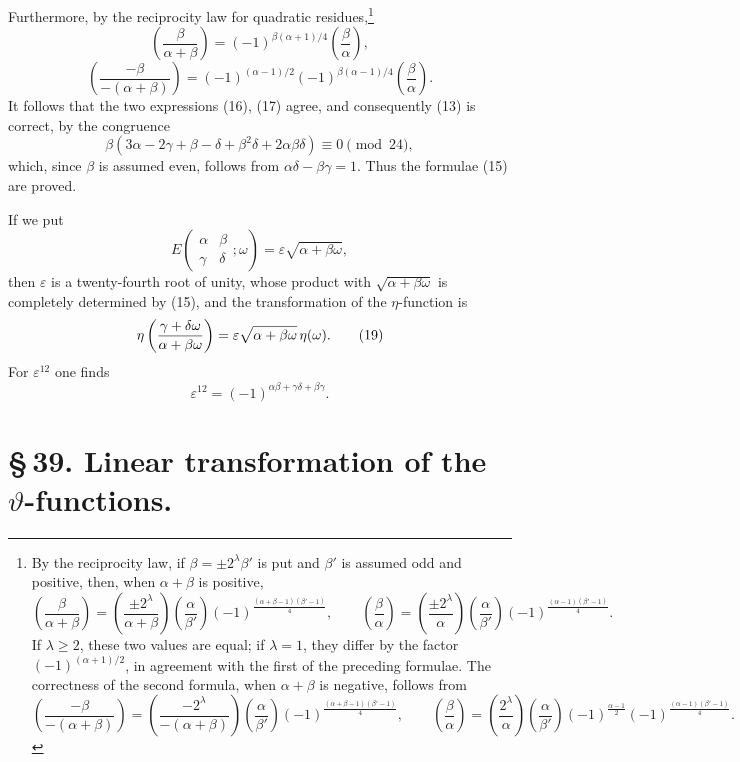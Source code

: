 \documentclass[11pt]{article}
\newcommand{\Jac}[2]{\left(\frac{#1}{#2}\right)}
\begin{document}
Furthermore, by the reciprocity law for quadratic residues,\footnote{By the reciprocity law, if $\beta=\pm2^\lambda\beta'$ is put and $\beta'$ is assumed odd and positive, then, when $\alpha+\beta$ is positive,
\[
\Jac{\beta}{\alpha+\beta}=\Jac{\pm2^\lambda}{\alpha+\beta}\Jac{\alpha}{\beta'}(-1)^{\frac{(\alpha+\beta-1)(\beta'-1)}{4}},
\qquad
\Jac{\beta}{\alpha}=\Jac{\pm2^\lambda}{\alpha}\Jac{\alpha}{\beta'}(-1)^{\frac{(\alpha-1)(\beta'-1)}{4}}.
\]
If $\lambda\ge2$, these two values are equal; if $\lambda=1$, they differ by the factor $(-1)^{(\alpha+1)/2}$, in agreement with the first of the preceding formulae. The correctness of the second formula, when $\alpha+\beta$ is negative, follows from
\[
\Jac{-\beta}{-(\alpha+\beta)}=\Jac{-2^\lambda}{-(\alpha+\beta)}\Jac{\alpha}{\beta'}(-1)^{\frac{(\alpha+\beta-1)(\beta'-1)}{4}},
\qquad
\Jac{\beta}{\alpha}=\Jac{2^\lambda}{\alpha}\Jac{\alpha}{\beta'}(-1)^{\frac{\alpha-1}{2}}(-1)^{\frac{(\alpha-1)(\beta'-1)}{4}}.
\]
}
\[
\Jac{\beta}{\alpha+\beta}=(-1)^{\beta(\alpha+1)/4}\Jac{\beta}{\alpha},
\]
\[
\Jac{-\beta}{-(\alpha+\beta)}=(-1)^{(\alpha-1)/2}(-1)^{\beta(\alpha-1)/4}\Jac{\beta}{\alpha}.
\]
It follows that the two expressions (16), (17) agree, and consequently (13) is correct, by the congruence
\[
\beta(3\alpha-2\gamma+\beta-\delta+\beta^2\delta+2\alpha\beta\delta)
\equiv0\pmod{24},
\]
which, since $\beta$ is assumed even, follows from $\alpha\delta-\beta\gamma=1$. Thus the formulae (15) are proved.

If we put
\begin{equation}
E\left(\begin{matrix}\alpha&\beta\\\gamma&\delta\end{matrix};\omega\right)
=\varepsilon\sqrt{\alpha+\beta\omega},
\tag{18}
\end{equation}
then $\varepsilon$ is a twenty-fourth root of unity, whose product with $\sqrt{\alpha+\beta\omega}$ is completely determined by (15), and the transformation of the $\eta$-function is
\begin{equation}
\eta\left({\gamma+\delta\omega\over\alpha+\beta\omega}\right)
=\varepsilon\sqrt{\alpha+\beta\omega}\,\eta(\omega).
\tag{19}
\end{equation}
For $\varepsilon^{12}$ one finds
\begin{equation}
\varepsilon^{12}=(-1)^{\alpha\beta+\gamma\delta+\beta\gamma}. 
\tag{20}
\end{equation}

\section*{\S\,39. Linear transformation of the $\vartheta$-functions.}
\end{document}
